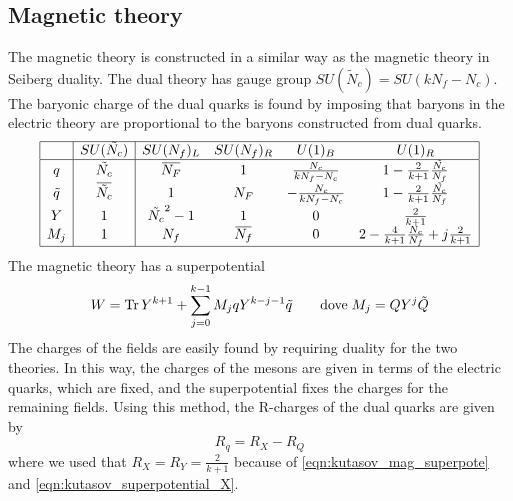 \subsection{Magnetic theory}
The magnetic theory is constructed in a similar way as the magnetic theory in Seiberg duality.
The dual theory has gauge group $SU(\tilde N_c) = SU(k N_f - N_c)$. 
The baryonic charge of the dual quarks is found by imposing that baryons in the electric theory are proportional to the baryons constructed from dual quarks.
\begin{equation}
\begin{array}{|c |  c | c c c c |}
\hline
 & SU(\tilde{N_c})  & SU(N_f)_L  &SU(N_f)_R   & U(1)_B &  U(1)_R \\
\hline
q &  \tilde{N_c} & \overbar{N_F}  & 1   &   \frac{N_c}{k N_f - N_c }  &  1 - \frac{2}{k+1} \frac{ \tilde{N_c}}{N_f}  \\
\tilde{q} & \overbar{\tilde{N_c}}  & 1  &  N_F  & -\frac{N_c}{k N_f - N_c }   &   1 - \frac{2}{k+1} \frac{\tilde{N_c}}{N_f}   \\
Y & 1  &  \tilde{N_c}^2-1  & 1    & 0   &  \frac{2}{k+1} \\
 M_j & 1 & N_f &  \overbar{N_f} & 0 & 2 - \frac{4}{k+1} \frac{N_c}{N_f} + j \frac{2}{k+1} \\
 \hline
\end{array}
\label{table:charge_table_mag_ks_4d}
\end{equation}
The magnetic theory has a superpotential
\begin{equation}
W = \mathrm{Tr } \, Y^{k+1} + \sum_{j=0}^{k-1} M_j q Y^{k-j-1} \tilde{q} \qquad \hbox{dove} \; M_j = Q Y^j \tilde{Q}
\label{eqn:kutasov_mag_superpote}
\end{equation}
The charges of the fields are easily found by requiring duality for the two theories.
In this way, the charges of the mesons are given in terms of the electric quarks, which are fixed, and the superpotential fixes the charges for the remaining fields.
Using this method, the R-charges of the dual quarks are given by
\begin{equation}
   R_q = R_X - R_Q 
 \label{eqn:R-charge_dual_quark}
\end{equation}
where we used that $R_X = R_Y = \frac{2}{k+1}$ because of \eqref{eqn:kutasov_mag_superpote} and \eqref{eqn:kutasov_superpotential_X}.















